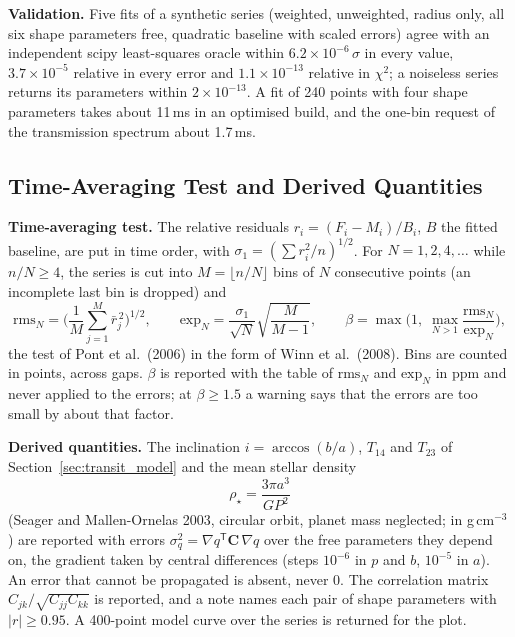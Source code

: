 \documentclass[11pt,a4paper]{article}
\newcommand{\mat}[1]{\mathbf{#1}}
\begin{document}
    \textbf{Validation.} Five fits of a synthetic series (weighted, unweighted, radius only, all six shape parameters free, quadratic baseline with scaled errors) agree with an independent scipy least-squares oracle within $6.2 \times 10^{-6}\,\sigma$ in every value, $3.7 \times 10^{-5}$ relative in every error and $1.1 \times 10^{-13}$ relative in $\chi^2$; a noiseless series returns its parameters within $2 \times 10^{-13}$. A fit of 240 points with four shape parameters takes about 11\,ms in an optimised build, and the one-bin request of the transmission spectrum about 1.7\,ms.

    \subsection{Time-Averaging Test and Derived Quantities}
    \label{sec:transit_diag}

    \textbf{Time-averaging test.} The relative residuals $r_i = (F_i - M_i)/B_i$, $B$ the fitted baseline, are put in time order, with $\sigma_1 = (\sum r_i^2/n)^{1/2}$. For $N = 1, 2, 4, \ldots$ while $n/N \ge 4$, the series is cut into $M = \lfloor n/N \rfloor$ bins of $N$ consecutive points (an incomplete last bin is dropped) and
    \begin{equation}
        \text{rms}_N = \Big(\frac{1}{M}\sum_{j=1}^{M} \bar{r}_j^{\,2}\Big)^{1/2}, \qquad
        \text{exp}_N = \frac{\sigma_1}{\sqrt{N}} \sqrt{\frac{M}{M - 1}}, \qquad
        \beta = \max\Big(1,\; \max_{N > 1} \frac{\text{rms}_N}{\text{exp}_N}\Big),
    \end{equation}
    the test of Pont et al.\ (2006) in the form of Winn et al.\ (2008). Bins are counted in points, across gaps. $\beta$ is reported with the table of $\text{rms}_N$ and $\text{exp}_N$ in ppm and never applied to the errors; at $\beta \ge 1.5$ a warning says that the errors are too small by about that factor.

    \textbf{Derived quantities.} The inclination $i = \arccos(b/a)$, $T_{14}$ and $T_{23}$ of Section~\ref{sec:transit_model} and the mean stellar density
    \begin{equation}
        \rho_\star = \frac{3\pi a^3}{G P^2}
    \end{equation}
    (Seager and Mallen-Ornelas 2003, circular orbit, planet mass neglected; in g\,cm$^{-3}$) are reported with errors $\sigma_q^2 = \nabla q^{\mathsf{T}} \mat{C}\, \nabla q$ over the free parameters they depend on, the gradient taken by central differences (steps $10^{-6}$ in $p$ and $b$, $10^{-5}$ in $a$). An error that cannot be propagated is absent, never 0. The correlation matrix $C_{jk}/\sqrt{C_{jj}C_{kk}}$ is reported, and a note names each pair of shape parameters with $|r| \ge 0.95$. A 400-point model curve over the series is returned for the plot.
\end{document}
